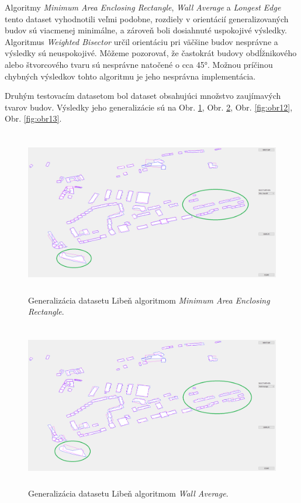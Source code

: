 \documentclass[11pt]{article}
\begin{document}
\noindent Algoritmy \textit{Minimum Area Enclosing Rectangle}, \textit{Wall Average} a \textit{Longest Edge} tento dataset vyhodnotili veľmi podobne, rozdiely v orientácií generalizovaných budov sú viacmenej minimálne, a zároveň boli dosiahnuté uspokojivé výsledky. Algoritmus \textit{Weighted Bisector} určil orientáciu pri väčšine budov nesprávne a výsledky sú neuspokojivé. Môžeme pozorovať, že častokrát budovy obdĺžnikového alebo štvorcového tvaru sú nesprávne natočené o cca 45°. Možnou príčinou chybných výsledkov tohto algoritmu je jeho nesprávna implementácia.

\newpage
Druhým testovacím datasetom bol dataset obsahujúci množstvo zaujímavých tvarov budov. Výsledky jeho generalizácie sú na Obr. \ref{fig:obr10}, Obr. \ref{fig:obr11}, Obr. \ref{fig:obr12}, Obr. \ref{fig:obr13}.

\begin{figure}[h]
\captionsetup{justification=centering}
\centering
\includegraphics[width=14.65cm, height=7.2cm]{images/liben_maer.png}
\caption{Generalizácia datasetu Libeň algoritmom \textit{Minimum Area Enclosing Rectangle}.}
\label{fig:obr10}
\end{figure}

\begin{figure}[h]
\captionsetup{justification=centering}
\centering
\includegraphics[width=14.65cm, height=7.2cm]{images/liben_wa.png}
\caption{Generalizácia datasetu Libeň algoritmom \textit{Wall Average}.}
\label{fig:obr11}
\end{figure}
\newpage
\end{document}
